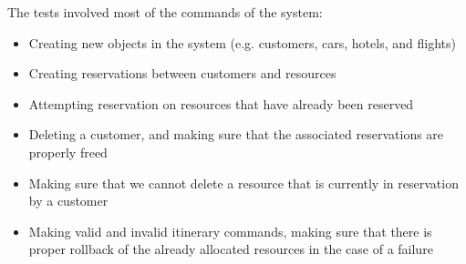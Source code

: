 \documentclass[11pt]{article}
\begin{document}
The tests involved most of the commands of the system:


\begin{itemize}
  \item Creating new objects in the system (e.g. customers, cars,
    hotels, and flights)
  \item Creating reservations between customers and resources
  \item Attempting reservation on resources that have already been
    reserved
  \item Deleting a customer, and making sure that the associated
    reservations are properly freed
  \item Making sure that we cannot delete a resource that is currently
    in reservation by a customer
  \item Making valid and invalid itinerary commands, making sure that
    there is proper rollback of the already allocated resources in the
    case of a failure
\end{itemize}
\end{document}
